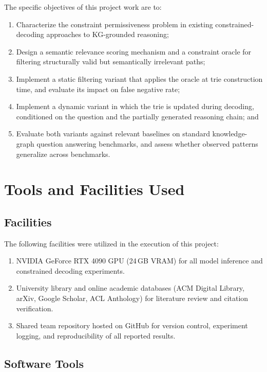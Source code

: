 \newpage

The specific objectives of this project work are to:

\begin{enumerate}[label=\roman*.]
  \item Characterize the constraint permissiveness problem in existing constrained-decoding approaches to KG-grounded reasoning;
  \item Design a semantic relevance scoring mechanism and a constraint oracle for filtering structurally valid but semantically irrelevant paths;
  \item Implement a static filtering variant that applies the oracle at trie construction time, and evaluate its impact on false negative rate;
  \item Implement a dynamic variant in which the trie is updated during decoding, conditioned on the question and the partially generated reasoning chain; and
  \item Evaluate both variants against relevant baselines on standard knowledge-graph question answering benchmarks, and assess whether observed patterns generalize across benchmarks.
\end{enumerate}

\section{Tools and Facilities Used}

\subsection{Facilities}

The following facilities were utilized in the execution of this project:

\begin{enumerate}[label=\roman*.]
  \item NVIDIA GeForce RTX 4090 GPU (24\,GB VRAM) for all model inference and constrained decoding experiments.
  \item University library and online academic databases (ACM Digital Library, arXiv, Google Scholar, ACL Anthology) for literature review and citation verification.
  \item Shared team repository hosted on GitHub for version control, experiment logging, and reproducibility of all reported results.
\end{enumerate}

\subsection{Software Tools}

